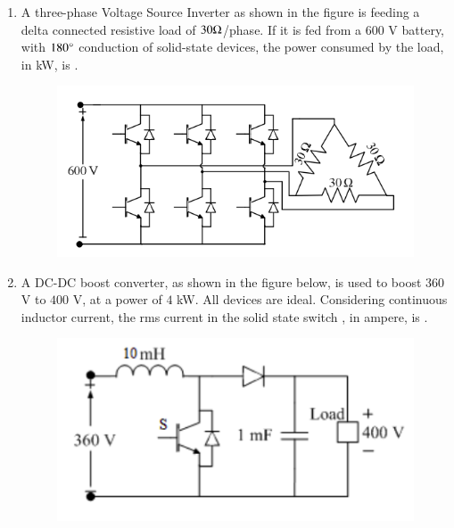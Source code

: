 \documentclass[journal,12pt,onecolumn]{IEEEtran}
\theoremstyle{remark}
\begin{document}
\begin{enumerate}[start=1, label=Q.\arabic*]
    \hfill{}

    \item A three-phase Voltage Source Inverter  as shown in the figure is feeding a delta connected resistive load of $30 \ohm$/phase. If it is fed from a $600$ V battery, with $180\degree$ conduction of solid-state devices, the power consumed by the load, in kW, is \underline{\hspace{2cm}}.
        \begin{figure}[H]
        \includegraphics[width=0.6\columnwidth]{Figures/2q46.png}
        \centering
        \caption{}
    \end{figure}

    \hfill{}

    \item A DC-DC boost converter, as shown in the figure below, is used to boost $360$V to $400$ V, at a power of $4$ kW. All devices are ideal. Considering continuous inductor current, the rms current in the solid state switch , in ampere, is \underline{\hspace{2cm}}.
        \begin{figure}[H]
        \includegraphics[width=0.6\columnwidth]{Figures/2q47.png}
        \centering
        \caption{}
    \end{figure}

    \hfill{}


\end{enumerate}
\end{document}
